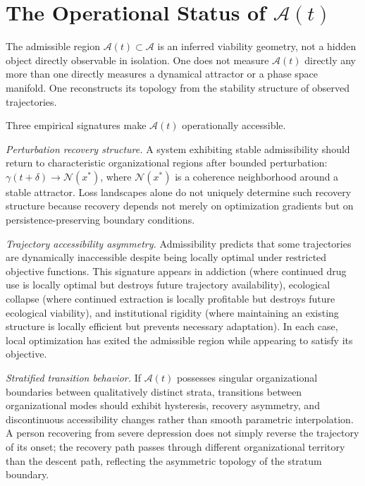 \documentclass[12pt,oneside]{book}
\theoremstyle{plain}
\theoremstyle{definition}
\theoremstyle{plain}
\newcommand{\cA}{\mathcal{A}}
\begin{document}
\section{The Operational Status of \texorpdfstring{$\mathcal{A}(t)$}{A(t)}}

The admissible region $\mathcal{A}(t) \subset \cA$ is an inferred viability geometry, not a hidden object directly observable in isolation. One does not measure $\mathcal{A}(t)$ directly any more than one directly measures a dynamical attractor or a phase space manifold. One reconstructs its topology from the stability structure of observed trajectories.

Three empirical signatures make $\mathcal{A}(t)$ operationally accessible.

\emph{Perturbation recovery structure.} A system exhibiting stable admissibility should return to characteristic organizational regions after bounded perturbation: $\gamma(t + \delta) \to \mathcal{N}(x^*)$, where $\mathcal{N}(x^*)$ is a coherence neighborhood around a stable attractor. Loss landscapes alone do not uniquely determine such recovery structure because recovery depends not merely on optimization gradients but on persistence-preserving boundary conditions.

\emph{Trajectory accessibility asymmetry.} Admissibility predicts that some trajectories are dynamically inaccessible despite being locally optimal under restricted objective functions. This signature appears in addiction (where continued drug use is locally optimal but destroys future trajectory availability), ecological collapse (where continued extraction is locally profitable but destroys future ecological viability), and institutional rigidity (where maintaining an existing structure is locally efficient but prevents necessary adaptation). In each case, local optimization has exited the admissible region while appearing to satisfy its objective.

\emph{Stratified transition behavior.} If $\mathcal{A}(t)$ possesses singular organizational boundaries between qualitatively distinct strata, transitions between organizational modes should exhibit hysteresis, recovery asymmetry, and discontinuous accessibility changes rather than smooth parametric interpolation. A person recovering from severe depression does not simply reverse the trajectory of its onset; the recovery path passes through different organizational territory than the descent path, reflecting the asymmetric topology of the stratum boundary.
\end{document}
